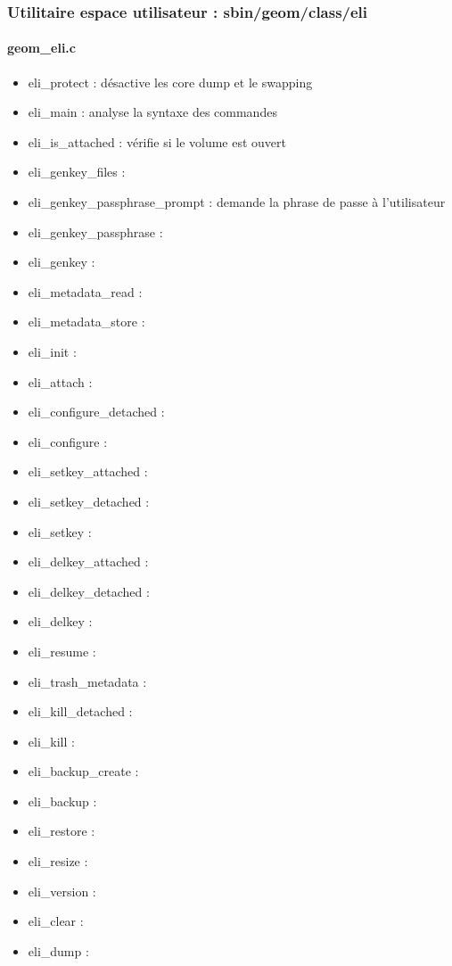 \subsubsection{Utilitaire espace utilisateur : sbin/geom/class/eli}
\paragraph{geom\_eli.c}
\begin{itemize}
	\item eli\_protect : désactive les core dump et le swapping
	\item eli\_main : analyse la syntaxe des commandes
	\item eli\_is\_attached : vérifie si le volume est ouvert
	\item eli\_genkey\_files : 
	\item eli\_genkey\_passphrase\_prompt : demande la phrase de passe à
		l'utilisateur
	\item eli\_genkey\_passphrase :
	\item eli\_genkey :
	\item eli\_metadata\_read :
	\item eli\_metadata\_store :
	\item eli\_init :
	\item eli\_attach :
	\item eli\_configure\_detached :
	\item eli\_configure :
	\item eli\_setkey\_attached :
	\item eli\_setkey\_detached :
	\item eli\_setkey :
	\item eli\_delkey\_attached :
	\item eli\_delkey\_detached :
	\item eli\_delkey :
	\item eli\_resume :
	\item eli\_trash\_metadata :
	\item eli\_kill\_detached :
	\item eli\_kill :
	\item eli\_backup\_create :
	\item eli\_backup :
	\item eli\_restore :
	\item eli\_resize :
	\item eli\_version :
	\item eli\_clear :
	\item eli\_dump :
\end{itemize}
